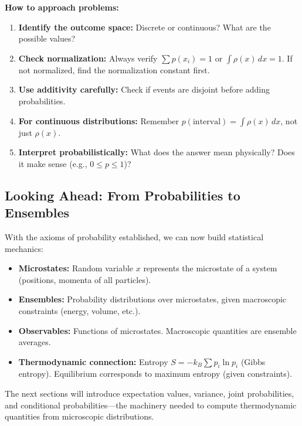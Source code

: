 \documentclass[9pt,twocoloumn]{article}
\begin{document}
\textbf{How to approach problems:}

\begin{enumerate}
    \item \textbf{Identify the outcome space:} Discrete or continuous? What are the possible values?
    
    \item \textbf{Check normalization:} Always verify $\sum p(x_i) = 1$ or $\int \rho(x) \, dx = 1$. If not normalized, find the normalization constant first.
    
    \item \textbf{Use additivity carefully:} Check if events are disjoint before adding probabilities.
    
    \item \textbf{For continuous distributions:} Remember $p(\text{interval}) = \int \rho(x) \, dx$, not just $\rho(x)$.
    
    \item \textbf{Interpret probabilistically:} What does the answer mean physically? Does it make sense (e.g., $0 \leq p \leq 1$)?
\end{enumerate}

\subsection{Looking Ahead: From Probabilities to Ensembles}

With the axioms of probability established, we can now build statistical mechanics:

\begin{itemize}
    \item \textbf{Microstates:} Random variable $x$ represents the microstate of a system (positions, momenta of all particles).
    \item \textbf{Ensembles:} Probability distributions over microstates, given macroscopic constraints (energy, volume, etc.).
    \item \textbf{Observables:} Functions of microstates. Macroscopic quantities are ensemble averages.
    \item \textbf{Thermodynamic connection:} Entropy $S = -k_B \sum p_i \ln p_i$ (Gibbs entropy). Equilibrium corresponds to maximum entropy (given constraints).
\end{itemize}

The next sections will introduce expectation values, variance, joint probabilities, and conditional probabilities—the machinery needed to compute thermodynamic quantities from microscopic distributions.
\end{document}
